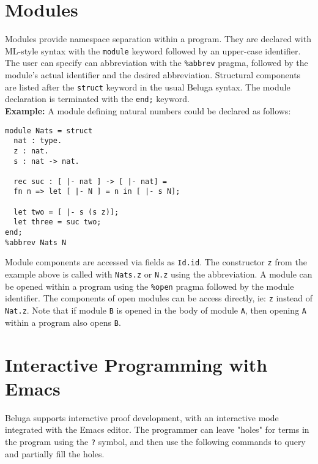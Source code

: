 \documentclass[11pt]{article}
\begin{document}


\section{Modules}
Modules provide namespace separation within a program. They are declared with ML-style syntax with the \texttt{module} keyword followed by an upper-case identifier. The user can specify can abbreviation with the \texttt{\%abbrev} pragma, followed by the module's actual identifier and the desired abbreviation. Structural components are listed after the \texttt{struct} keyword in the usual Beluga syntax. The module declaration is terminated with the \texttt{end;} keyword. \\

\textbf{Example:} A module defining natural numbers could be declared as follows:
\begin{verbatim} 
module Nats = struct  
  nat : type.
  z : nat.
  s : nat -> nat.

  rec suc : [ |- nat ] -> [ |- nat] =
  fn n => let [ |- N ] = n in [ |- s N];

  let two = [ |- s (s z)];
  let three = suc two;
end;
%abbrev Nats N
\end{verbatim}

Module components are accessed via fields as \texttt{Id.id}. The constructor \texttt{z} from the example above is called with \texttt{Nats.z} or \texttt{N.z} using the abbreviation. A module can be opened within a program using the \texttt{\%open} pragma followed by the module identifier. The components of open modules can be access directly, ie: \texttt{z} instead of \texttt{Nat.z}. Note that if module \texttt{B} is opened in the body of module \texttt{A}, then opening \texttt{A} within a program also opens \texttt{B}.


\section{Interactive Programming with Emacs}
Beluga supports interactive proof development, with an interactive mode integrated with the Emacs editor. The programmer can leave "holes" for terms in the program using the \texttt{?} symbol, and then use the following commands to query and partially fill the holes.
\end{document}
